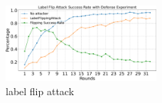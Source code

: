 \documentclass[conference]{IEEEtran}
\def\figLabelFlip{0.5\textwidth}
\begin{document}
\begin{figure}[htbp]
    \centerline{\includegraphics[width=\figLabelFlip]{pics/002-LabelFlippingAttack-attackRate.pdf}}
    \caption{label flip attack}
    \label{fig:labelFlip}
\end{figure}


\end{document}
